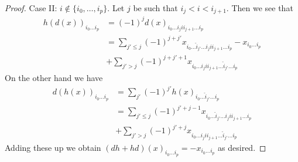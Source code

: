 \documentclass[10pt,a4paper]{amsart}
\theoremstyle{plain}
\theoremstyle{definition}
\theoremstyle{remark}
\numberwithin{equation}{subsection}
\begin{document}
\begin{proof}
\medskip\noindent
Case II: $i \not \in \{i_0, \ldots, i_p\}$. Let $j$ be such that
$i_j < i < i_{j + 1}$. Then we see that
\begin{align*}
h(d(x))_{i_0 \ldots i_p}
& =
(-1)^j d(x)_{i_0 \ldots i_j i i_{j + 1} \ldots i_p} \\
& =
\sum\nolimits_{j' \leq j} (-1)^{j + j'}
x_{i_0 \ldots \hat i_{j'} \ldots i_j i i_{j + 1} \ldots i_p} -
x_{i_0 \ldots i_p} \\
&
+ \sum\nolimits_{j' > j} (-1)^{j + j' + 1}
x_{i_0 \ldots i_j i i_{j + 1} \ldots \hat i_{j'} \ldots i_p}
\end{align*}
On the other hand we have
\begin{align*}
d(h(x))_{i_0 \ldots i_p}
& =
\sum\nolimits_{j'} (-1)^{j'} h(x)_{i_0 \ldots \hat i_{j'} \ldots i_p} \\
& =
\sum\nolimits_{j' \leq j} (-1)^{j' + j - 1}
x_{i_0 \ldots \hat i_{j'} \ldots i_j i i_{j + 1} \ldots i_p} \\
& +
\sum\nolimits_{j' > j} (-1)^{j' + j}
x_{i_0 \ldots i_j i i_{j + 1} \ldots \hat i_{j'} \ldots i_p}
\end{align*}
Adding these up we obtain
$(dh + hd)(x)_{i_0 \ldots i_p} = - x_{i_0 \ldots i_p}$
as desired.
\end{proof}
\end{document}
